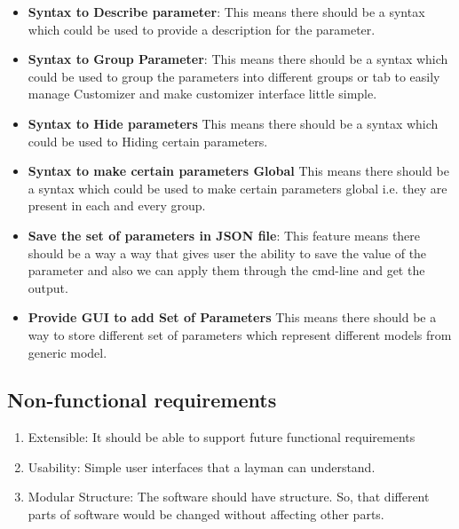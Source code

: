 \begin{itemize}
\begin{enumerate}
    \end{enumerate}
    \item {\bf Syntax to Describe parameter}:
        This means there should be a syntax which could be used to provide a description for the parameter.
    \item \textbf{Syntax to Group Parameter}:
        This means there should be a syntax which could be used to group the parameters into different groups or tab to easily manage Customizer and make customizer interface little simple.
    \item \textbf{Syntax to Hide parameters}
        This means there should be a syntax which could be used to Hiding certain parameters.
    \item \textbf{Syntax to make certain parameters Global}
        This means there should be a syntax which could be used to make certain parameters global i.e. they are present in each and every group.
    \item \textbf{Save the set of parameters in JSON file}:
    This feature means there should be a way a way that gives user the ability to save the value of the parameter and also we can apply them through the cmd-line and get the output.
   
    \item \textbf{Provide GUI to add Set of Parameters}
        This means there should be a way to store different set of parameters which represent different models from generic model.
    \end{itemize}
\subsection{Non-functional requirements}
\begin{enumerate}
    \item Extensible: It should be able to support future functional requirements
    \item Usability: Simple user interfaces that a layman can understand.
    \item Modular Structure: The software should have  structure. So, that different parts of software would be changed without affecting other parts.
 
\end{enumerate}

